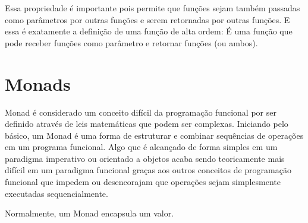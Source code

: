 Essa propriedade é importante pois permite que funções 
sejam também passadas como parâmetros por outras funções e 
serem retornadas por outras funções. E essa é exatamente a 
definição de uma função de alta ordem: É uma função que 
pode receber funções como parâmetro e retornar funções (ou 
ambos).

\section{Monads}

Monad é considerado um conceito difícil da programação 
funcional por ser definido através de leis matemáticas 
que podem ser complexas. Iniciando pelo básico, um Monad 
é uma forma de estruturar e combinar sequências de 
operações em um programa funcional. Algo que é alcançado 
de forma simples em um paradigma imperativo ou orientado 
a objetos acaba sendo teoricamente mais difícil em um 
paradigma funcional graças aos outros conceitos de 
programação funcional que impedem ou desencorajam que 
operações sejam simplesmente executadas sequencialmente.

Normalmente, um Monad encapsula um valor.
